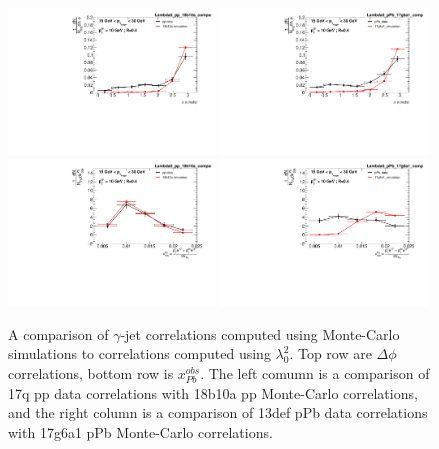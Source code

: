 \begin{figure}
    \centering
    \includegraphics[width=0.49\textwidth]{GammaJet/pp_pPb_correlations/sig_dPhiLambda0_pp_18b10a_comparison_Comparison.pdf}
    \includegraphics[width=0.49\textwidth]{GammaJet/pp_pPb_correlations/sig_dPhiLambda0_pPb_17g6a1_comparison_Comparison.pdf} \\
    \includegraphics[width=0.49\textwidth]{GammaJet/pp_pPb_correlations/sig_XobsPbLambda0_pp_18b10a_comparison_Comparison.pdf}
    \includegraphics[width=0.49\textwidth]{GammaJet/pp_pPb_correlations/sig_XobsPbLambda0_pPb_17g6a1_comparison_Comparison.pdf}
    \caption{A comparison of $\gamma$-jet correlations computed using Monte-Carlo simulations to correlations computed using $\lambda_0^2$. Top row are $\Delta \phi$ correlations, bottom row is $x^{obs}_{Pb}$. The left comumn is a comparison of 17q pp data correlations with 18b10a pp Monte-Carlo correlations, and the right column is a comparison of 13def pPb data correlations with 17g6a1 pPb Monte-Carlo correlations.}
    \label{fig:data_simulation_correlation}
\end{figure}


